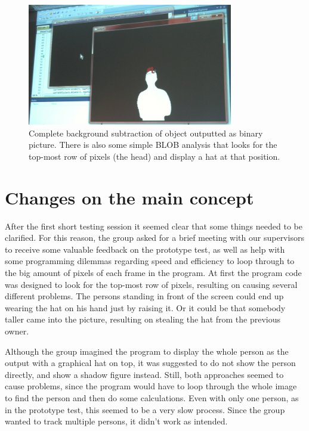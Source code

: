\begin{figure}[htbp]
\centering
\includegraphics[width=0.80\textwidth]{Pictures/Test/MaxSubtracted.jpg}
\caption{Complete background subtraction of object outputted as binary picture. There is also some simple BLOB analysis that looks for the top-most row of pixels (the head) and display a hat at that position.}
\label{fig:max_subtracted}
\end{figure}

\section{Changes on the main concept}
After the first short testing session it seemed clear that some things needed to be clarified. For this reason, the group asked for a brief meeting with our supervisors to receive some valuable feedback on the prototype test, as well as help with some programming dilemmas regarding speed and efficiency to loop through to the big amount of pixels of each frame in the program. At first the program code was designed to look for the top-most row of pixels, resulting on causing several different problems. The persons standing in front of the screen could end up wearing the hat on his hand just by raising it. Or it could be that somebody taller came into the picture, resulting on stealing the hat from the previous owner.

Although the group imagined the program to display the whole person as the output with a graphical hat on top, it was suggested to do not show the person directly, and show a shadow figure instead. Still, both approaches seemed to cause problems, since the program would have to loop through the whole image to find the person and then do some calculations. Even with only one person, as in the prototype test, this seemed to be a very slow process. Since the group wanted to track multiple persons, it didn't work as intended.

